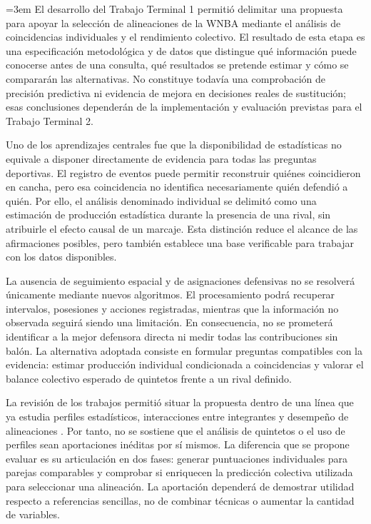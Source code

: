 \begingroup
\emergencystretch=3em
El desarrollo del Trabajo Terminal 1 permitió delimitar una propuesta para apoyar la selección de alineaciones de la WNBA mediante el análisis de coincidencias individuales y el rendimiento colectivo. El resultado de esta etapa es una especificación metodológica y de datos que distingue qué información puede conocerse antes de una consulta, qué resultados se pretende estimar y cómo se compararán las alternativas. No constituye todavía una comprobación de precisión predictiva ni evidencia de mejora en decisiones reales de sustitución; esas conclusiones dependerán de la implementación y evaluación previstas para el Trabajo Terminal 2.

Uno de los aprendizajes centrales fue que la disponibilidad de estadísticas no equivale a disponer directamente de evidencia para todas las preguntas deportivas. El registro de eventos puede permitir reconstruir quiénes coincidieron en cancha, pero esa coincidencia no identifica necesariamente quién defendió a quién. Por ello, el análisis denominado individual se delimitó como una estimación de producción estadística durante la presencia de una rival, sin atribuirle el efecto causal de un marcaje. Esta distinción reduce el alcance de las afirmaciones posibles, pero también establece una base verificable para trabajar con los datos disponibles.

La ausencia de seguimiento espacial y de asignaciones defensivas no se resolverá únicamente mediante nuevos algoritmos. El procesamiento podrá recuperar intervalos, posesiones y acciones registradas, mientras que la información no observada seguirá siendo una limitación. En consecuencia, no se prometerá identificar a la mejor defensora directa ni medir todas las contribuciones sin balón. La alternativa adoptada consiste en formular preguntas compatibles con la evidencia: estimar producción individual condicionada a coincidencias y valorar el balance colectivo esperado de quintetos frente a un rival definido.

La revisión de los trabajos permitió situar la propuesta dentro de una línea que ya estudia perfiles estadísticos, interacciones entre integrantes y desempeño de alineaciones \cite{yamada2024offensivelineupanalysisbasketball,josephs2025hypergraphadjustedplusminus}. Por tanto, no se sostiene que el análisis de quintetos o el uso de perfiles sean aportaciones inéditas por sí mismos. La diferencia que se propone evaluar es su articulación en dos fases: generar puntuaciones individuales para parejas comparables y comprobar si enriquecen la predicción colectiva utilizada para seleccionar una alineación. La aportación dependerá de demostrar utilidad respecto a referencias sencillas, no de combinar técnicas o aumentar la cantidad de variables.

